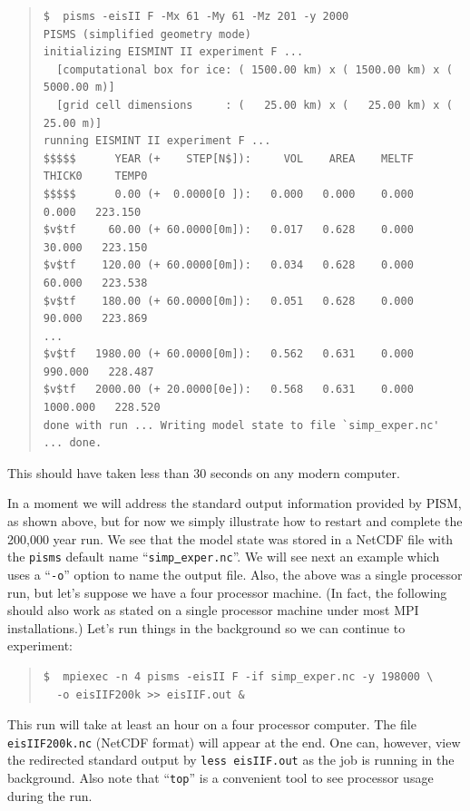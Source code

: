 \documentclass[11pt,final]{amsart}
\renewcommand{\t}[1]{\texttt{#1}}
\begin{document}
\small\begin{quote}\begin{verbatim}
$  pisms -eisII F -Mx 61 -My 61 -Mz 201 -y 2000
PISMS (simplified geometry mode)
initializing EISMINT II experiment F ...
  [computational box for ice: ( 1500.00 km) x ( 1500.00 km) x ( 5000.00 m)]
  [grid cell dimensions     : (   25.00 km) x (   25.00 km) x (   25.00 m)]
running EISMINT II experiment F ...
$$$$$      YEAR (+    STEP[N$]):     VOL    AREA    MELTF     THICK0     TEMP0
$$$$$      0.00 (+  0.0000[0 ]):   0.000   0.000    0.000      0.000   223.150
$v$tf     60.00 (+ 60.0000[0m]):   0.017   0.628    0.000     30.000   223.150
$v$tf    120.00 (+ 60.0000[0m]):   0.034   0.628    0.000     60.000   223.538
$v$tf    180.00 (+ 60.0000[0m]):   0.051   0.628    0.000     90.000   223.869
...
$v$tf   1980.00 (+ 60.0000[0m]):   0.562   0.631    0.000    990.000   228.487
$v$tf   2000.00 (+ 20.0000[0e]):   0.568   0.631    0.000   1000.000   228.520
done with run ... Writing model state to file `simp_exper.nc' ... done.
\end{verbatim}
\end{quote}\normalsize
\noindent This should have taken less than 30 seconds on any modern computer.  

In a moment we will address the standard output information provided by PISM, as shown above, but for now we simply illustrate how to restart and complete the 200,000 year run.  We see that the model state was stored in a NetCDF file with the \verb|pisms| default name ``\texttt{simp\underline{ }exper.nc}''.  We will see next an example which uses a ``\verb|-o|'' option to name the output file.  Also, the above was a single processor run, but let's suppose we have a four processor machine.  (In fact, the following should also work as stated on a single processor machine under most MPI installations.)  Let's run things in the background so we can continue to experiment:

\small\begin{quote}\begin{verbatim}
$  mpiexec -n 4 pisms -eisII F -if simp_exper.nc -y 198000 \
  -o eisIIF200k >> eisIIF.out &
\end{verbatim}
\end{quote}\normalsize

This run will take at least an hour on a four processor computer.  The file \verb|eisIIF200k.nc| (NetCDF format) will appear at the end.  One can, however, view the redirected standard output by \verb|less eisIIF.out| as the job is running in the background.  Also note that ``\t{top}'' is a convenient tool to see processor usage during the run.
\end{document}

